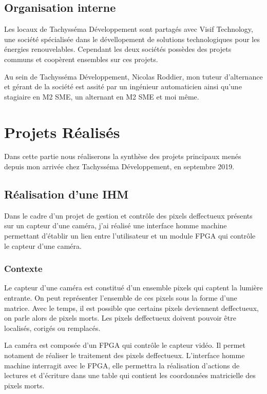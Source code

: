 \subsection{Organisation interne}

Les locaux de Tachysséma Développement sont partagés avec Visif Technology, une société spécialisée dans le dévellopement de solutions technologiques pour les énergies renouvelables. Cependant les deux sociétés possèdes des projets communs et coopèrent ensembles sur ces projets. 

Au sein de Tachysséma Développement, Nicolas Roddier, mon tuteur d'alternance et gérant de la société est assité par un ingénieur automaticien ainsi qu'une stagiaire en M2 SME, un alternant en M2 SME et moi même. 





\newpage

\section{Projets Réalisés}
Dans cette partie nous réaliserons la synthèse des projets principaux menés depuis mon arrivée chez Tachysséma Développement, en septembre 2019. 

\subsection{Réalisation d'une IHM}

Dans le cadre d'un projet de gestion et contrôle des pixels deffectueux présents sur un capteur d'une caméra, j'ai réalisé une interface homme machine permettant d'établir un lien entre l'utilisateur et un module FPGA qui contrôle le capteur d'une caméra. 
\\ 

\subsubsection{Contexte} 

Le capteur d'une caméra est constitué d'un ensemble pixels qui captent la lumière entrante. On peut représenter l'ensemble de ces pixels sous la forme d'une matrice. Avec le temps, il est possible que certains pixels deviennent deffectueux, on parle alors de pixels morts. Les pixels deffectueux doivent pouvoir être localisés, corigés ou remplacés.  
\newline

La caméra est composée d'un FPGA qui contrôle le capteur vidéo. Il permet notament de réaliser le traitement des pixels deffectueux. L'interface homme machine interragit avec le FPGA, elle permettra la réalisation d'actions de lectures et d'écriture dans une table qui contient les coordonnées matricielle des pixels morts. 

